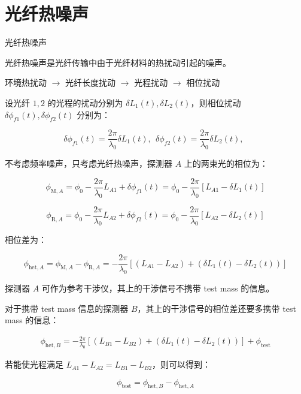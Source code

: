 \documentclass{beamer}
\begin{document}
\section{光纤热噪声}
\begin{frame}{光纤热噪声}
    
    光纤热噪声是光纤传输中由于光纤材料的热扰动引起的噪声。

    环境热扰动 $\to$ 光纤长度扰动 $\to$ 光程扰动 $\to$ 相位扰动

    设光纤 $1,2$ 的光程的扰动分别为 $\delta L_1(t),\delta L_2(t)$，则相位扰动 $\delta \phi_{f1}(t),\delta \phi_{f2}(t) $ 分别为：

    $$
    \delta \phi_{f1}(t)
    =\frac{2\pi}{\lambda_0} \delta L_1(t),~~
    \delta \phi_{f2}(t)
    =\frac{2\pi}{\lambda_0} \delta L_2(t),~~
    $$

    不考虑频率噪声，只考虑光纤热噪声，探测器 $A$ 上的两束光的相位为：

    $$
    \phi_{\mathrm{M},A}
    =\phi_0-\frac{2\pi}{\lambda_0}L_{A1}+\delta \phi_{f1}(t)
    =\phi_0-\frac{2\pi}{\lambda_0}\left[L_{A1}-\delta L_1(t) \right]
    $$

    $$
    \phi_{\mathrm{R},A}
    =\phi_0-\frac{2\pi}{\lambda_0}L_{A2}+\delta \phi_{f2}(t)
    =\phi_0-\frac{2\pi}{\lambda_0}\left[L_{A2}-\delta L_2(t) \right]
    $$

    相位差为：

    $$
    \phi_{\mathrm{het},A}
    =\phi_{\mathrm{M},A}-\phi_{\mathrm{R},A}
    =-\frac{2\pi}{\lambda_0}\left[(L_{A1}-L_{A2}) + (\delta L_1(t)-\delta L_2(t)) \right]
    $$

\end{frame}

\begin{frame}
    探测器 $A$ 可作为参考干涉仪，其上的干涉信号不携带 test mass 的信息。
    
    对于携带 test mass 信息的探测器 $B$，其上的干涉信号的相位差还要多携带 test mass 的信息：

    $$
    \begin{aligned}
    \phi_{\mathrm{het},B}
    =-\frac{2\pi}{\lambda_0}\left[(L_{B1}-L_{B2}) + (\delta L_1(t)-\delta L_2(t)) \right] + \phi_{\mathrm{test}}
    \end{aligned}
    $$

    若能使光程满足 $L_{A1}-L_{A2}=L_{B1}-L_{B2} $，则可以得到：

    $$
    \phi_{\mathrm{test}}
    =\phi_{\mathrm{het},B}-\phi_{\mathrm{het},A}
    $$

\end{frame}
\end{document}
